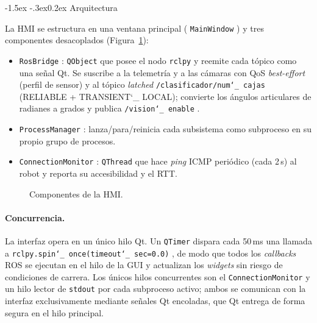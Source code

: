 \documentclass[12pt,a4paper]{article}
\makeatletter
\renewcommand\subsubsection{\@startsection{subsubsection}{3}{\z@}%
  {-1.5ex \@plus -.3ex}{0.2ex}%
  {\normalsize\bfseries\color{MediumBlue}}}
\newcommand{\code}[1]{%
  \begingroup
  \def\_{\char`_\penalty0 }%
  \def\/{\char`/\penalty0 }%
  \texttt{\small #1}%
  \endgroup}
\makeatother
\begin{document}
\subsubsection{Arquitectura}

La HMI se estructura en una ventana principal (\code{MainWindow}) y tres
componentes desacoplados (Figura~\ref{fig:hmi-arq}):
\begin{itemize}
\item \code{RosBridge}: \code{QObject} que posee el nodo \code{rclpy} y reemite
cada tópico como una señal Qt. Se suscribe a la telemetría y a las cámaras con QoS
\textit{best-effort} (perfil de sensor) y al tópico \textit{latched}
\code{/clasificador/num\_cajas} (RELIABLE + TRANSIENT\_LOCAL); convierte los
ángulos articulares de radianes a grados y publica \code{/vision\_enable}.
\item \code{ProcessManager}: lanza/para/reinicia cada subsistema como
subproceso en su propio grupo de procesos.
\item \code{ConnectionMonitor}: \code{QThread} que hace \emph{ping} ICMP periódico
(cada 2\,s) al robot y reporta su accesibilidad y el RTT.
\end{itemize}

\begin{figure}[H]
\centering
{}
\caption{Componentes de la HMI.}
\label{fig:hmi-arq}
\end{figure}

\paragraph{Concurrencia.} La interfaz opera en un único hilo Qt. Un \code{QTimer}
dispara cada 50\,ms una llamada a \code{rclpy.spin\_once(timeout\_sec=0.0)}, de
modo que todos los \textit{callbacks} ROS se ejecutan en el hilo de la GUI y
actualizan los \textit{widgets} sin riesgo de condiciones de carrera. Los únicos
hilos concurrentes son el \code{ConnectionMonitor} y un hilo lector de
\code{stdout} por cada subproceso activo; ambos se comunican con la interfaz
exclusivamente mediante señales Qt encoladas, que Qt entrega de forma segura en el
hilo principal.
\end{document}
